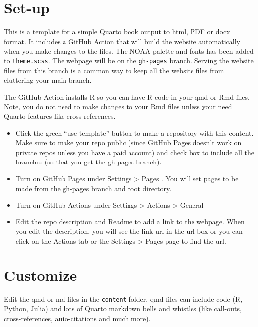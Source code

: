 \documentclass[
  letterpaper,
  oneside,
  open=any]{scrbook}
\begin{document}

\hypertarget{set-up}{%
\chapter{Set-up}\label{set-up}}

This is a template for a simple Quarto book output to html, PDF or docx
format. It includes a GitHub Action that will build the website
automatically when you make changes to the files. The NOAA palette and
fonts has been added to \texttt{theme.scss}. The webpage will be on the
\texttt{gh-pages} branch. Serving the website files from this branch is
a common way to keep all the website files from cluttering your main
branch.

The GitHub Action installs R so you can have R code in your qmd or Rmd
files. Note, you do not need to make changes to your Rmd files unless
your need Quarto features like cross-references.

\begin{itemize}
\item
  Click the green ``use template'' button to make a repository with this
  content. Make sure to make your repo public (since GitHub Pages
  doesn't work on private repos unless you have a paid account) and
  check box to include all the branches (so that you get the gh-pages
  branch).
\item
  Turn on GitHub Pages under Settings \textgreater{} Pages . You will
  set pages to be made from the gh-pages branch and root directory.
\item
  Turn on GitHub Actions under Settings \textgreater{} Actions
  \textgreater{} General
\item
  Edit the repo description and Readme to add a link to the webpage.
  When you edit the description, you will see the link url in the url
  box or you can click on the Actions tab or the Settings \textgreater{}
  Pages page to find the url.
\end{itemize}


\hypertarget{customize}{%
\chapter{Customize}\label{customize}}

Edit the qmd or md files in the \texttt{content} folder. qmd files can
include code (R, Python, Julia) and lots of Quarto markdown bells and
whistles (like call-outs, cross-references, auto-citations and much
more).
\end{document}
